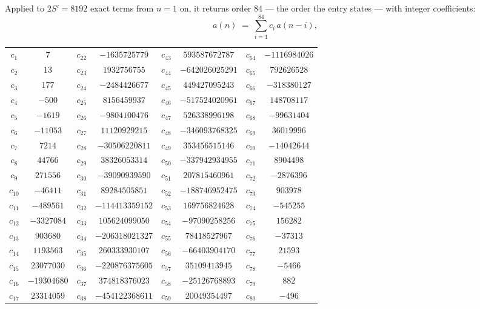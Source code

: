 \documentclass[11pt,a4paper]{article}
\theoremstyle{plain}
\theoremstyle{definition}
\begin{document}
Applied to $2S'=8192$ exact terms from $n=1$ on, it returns order $84$ --- the
order the entry states --- with integer coefficients:
\[
a(n)\;=\;\sum_{i=1}^{84}c_i\,a(n-i),
\]
\begin{center}\small
\begin{tabular}{cccccccc}
$c_{1}$ & $7$ & $c_{22}$ & $-1635725779$ & $c_{43}$ & $593587672787$ & $c_{64}$ & $-1116984026$ \\
$c_{2}$ & $13$ & $c_{23}$ & $1932756755$ & $c_{44}$ & $-642026025291$ & $c_{65}$ & $792626528$ \\
$c_{3}$ & $177$ & $c_{24}$ & $-2484426677$ & $c_{45}$ & $449427095243$ & $c_{66}$ & $-318380127$ \\
$c_{4}$ & $-500$ & $c_{25}$ & $8156459937$ & $c_{46}$ & $-517524020961$ & $c_{67}$ & $148708117$ \\
$c_{5}$ & $-1619$ & $c_{26}$ & $-9804100476$ & $c_{47}$ & $526338996198$ & $c_{68}$ & $-99631404$ \\
$c_{6}$ & $-11053$ & $c_{27}$ & $11120929215$ & $c_{48}$ & $-346093768325$ & $c_{69}$ & $36019996$ \\
$c_{7}$ & $7214$ & $c_{28}$ & $-30506220811$ & $c_{49}$ & $353456515146$ & $c_{70}$ & $-14042644$ \\
$c_{8}$ & $44766$ & $c_{29}$ & $38326053314$ & $c_{50}$ & $-337942934955$ & $c_{71}$ & $8904498$ \\
$c_{9}$ & $271556$ & $c_{30}$ & $-39090939590$ & $c_{51}$ & $207815460961$ & $c_{72}$ & $-2876396$ \\
$c_{10}$ & $-46411$ & $c_{31}$ & $89284505851$ & $c_{52}$ & $-188746952475$ & $c_{73}$ & $903978$ \\
$c_{11}$ & $-489561$ & $c_{32}$ & $-114413359152$ & $c_{53}$ & $169756824628$ & $c_{74}$ & $-545255$ \\
$c_{12}$ & $-3327084$ & $c_{33}$ & $105624099050$ & $c_{54}$ & $-97090258256$ & $c_{75}$ & $156282$ \\
$c_{13}$ & $903680$ & $c_{34}$ & $-206318021327$ & $c_{55}$ & $78418527967$ & $c_{76}$ & $-37313$ \\
$c_{14}$ & $1193563$ & $c_{35}$ & $260333930107$ & $c_{56}$ & $-66403904170$ & $c_{77}$ & $21593$ \\
$c_{15}$ & $23077030$ & $c_{36}$ & $-220876375605$ & $c_{57}$ & $35109413945$ & $c_{78}$ & $-5466$ \\
$c_{16}$ & $-19304680$ & $c_{37}$ & $374818376023$ & $c_{58}$ & $-25126768893$ & $c_{79}$ & $882$ \\
$c_{17}$ & $23314059$ & $c_{38}$ & $-454122368611$ & $c_{59}$ & $20049354497$ & $c_{80}$ & $-496$ \\

\end{tabular}
\end{center}
\end{document}
